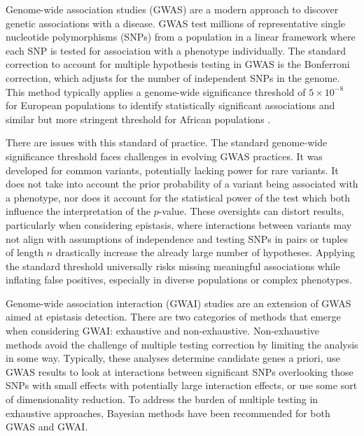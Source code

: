 \documentclass{article}\usepackage[]{graphicx}\usepackage[]{color}
\begin{document}
\par 
Genome-wide association studies (GWAS) are a modern approach to discover genetic associations with a disease. GWAS test millions of representative single nucleotide polymorphisms (SNPs) from a population in a linear framework where each SNP is tested for association with a phenotype individually. The standard correction to account for multiple hypothesis testing in GWAS is the Bonferroni correction, which adjusts for the number of independent SNPs in the genome. This method typically applies a genome-wide significance threshold of $5\times 10^{-8}$ for European populations to identify statistically significant associations and similar but more stringent threshold for African populations \cite{evangelouGeneticEpidemiologyMethods2018,shamStatisticalPowerSignificance2014}.
\par
There are issues with this standard of practice. The standard genome-wide significance threshold faces challenges in evolving GWAS practices. It was developed for common variants, potentially lacking power for rare variants. It does not take into account the prior probability of a variant being associated with a phenotype, nor does it account for the statistical power of the test which both influence the interpretation of the $p$-value. These oversights can distort results, particularly when considering epistasis, where interactions between variants may not align with assumptions of independence and testing SNPs in pairs or tuples of length $n$ drastically increase the already large number of hypotheses. Applying the standard threshold universally risks missing meaningful associations while inflating false positives, especially in diverse populations or complex phenotypes\cite{jiangBayesianMethodEvaluating2011,shamStatisticalPowerSignificance2014}.
\par
Genome-wide association interaction (GWAI) studies are an extension of GWAS aimed at epistasis detection\cite{bessonovCautionaryNoteImpact2015,gusarevaPracticalAspectsGenomewide2014}. There are two categories of methods that emerge when considering GWAI: exhaustive and non-exhaustive\cite{gusarevaPracticalAspectsGenomewide2014}. Non-exhaustive methods avoid the challenge of multiple testing correction by limiting the analysis in some way. Typically, these analyses determine candidate genes a priori, use GWAS results to look at interactions between significant SNPs overlooking those SNPs with small effects with potentially large interaction effects, or use some sort of dimensionality reduction\cite{gusarevaPracticalAspectsGenomewide2014,anChallengeDetectingEpistasis2009}. To address the burden of multiple testing in exhaustive approaches, Bayesian methods have been recommended for both GWAS and GWAI\cite{jiangBayesianMethodEvaluating2011,stephensBayesianStatisticalMethods2009,lopezBayesianStatisticalMethods,zhouPolygenicModelingBayesian2013,shamStatisticalPowerSignificance2014}.
\end{document}
